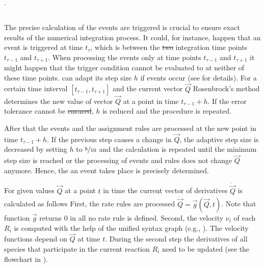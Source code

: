 \documentclass[10pt]{bmc_article}
\newenvironment{bmcformat}{\fussy\setboolean{publ}{true}}{\fussy}
\begin{document}
\begin{bmcformat}
.

\subsection*{}

The precise calculation of the  events are triggered is crucial
to ensure exact results of the numerical integration process.
It could, for instance, happen that an event is triggered at time $t_{\tau}$,
which is between the \sout{two} integration time points $t_{\tau - 1}$ and $t_{\tau + 1}$.
When processing the events only at time points $t_{\tau - 1}$ and $t_{\tau + 1}$\COR{,}
it might happen that the trigger condition cannot be evaluated to \true at
neither of these time points.
 \cite{Press1993} can adapt its step size $h$ if events
occur (see  for details).
For a certain time interval $[t_{\tau - 1}, t_{\tau + 1}]$ and the current vector
$\vec{Q}$\COR{,} Rosenbrock's method determines the new value of vector $\vec{Q}$ at a
point in time $t_{\tau - 1} + h$.
If the error tolerance cannot be \sout{ensured},
$h$ is reduced and the procedure is repeated.

After that\COR{,} the events and the assignment rules are processed at the new
point in time $t_{\tau - 1} + h$.
If the previous step causes a change in $\vec{Q}$, the adaptive step size is
decreased by setting $h$ to $\nicefrac{h}{10}$ and the calculation is repeated
until  the minimum step size is reached or the processing of events
and  rules does not change $\vec{Q}$ anymore.
Hence, the  an event takes place is precisely determined.

For given values $\vec{Q}$ at a point $t$ in time the current vector of
derivatives $\dot{\vec{Q}}$ is calculated as follows
First, the rate rules are processed $\dot{\vec{Q}} = \vec{g}(\vec{Q}, t)$.
Note that function $\vec{g}$ returns 0 in all  no rate rule is defined.
Second, the velocity $\nu_i$ of each  $R_i$ is computed
with the help of the unified syntax graph (e.g., ).
The velocity functions depend on $\vec{Q}$ at time $t$.
During the second step\COR{,} the derivatives of all species that participate in
the current reaction $R_i$ need to be updated (see the flowchart in
).


\end{bmcformat}
\end{document}
